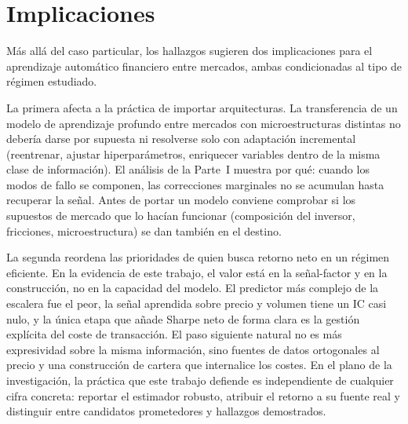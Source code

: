 \section{Implicaciones}

Más allá del caso particular, los hallazgos sugieren dos implicaciones para el aprendizaje
automático financiero entre mercados, ambas condicionadas al tipo de régimen estudiado.

La primera afecta a la práctica de importar arquitecturas. La transferencia de un modelo
de aprendizaje profundo entre mercados con microestructuras distintas no debería darse por
supuesta ni resolverse solo con adaptación incremental (reentrenar, ajustar
hiperparámetros, enriquecer variables dentro de la misma clase de información). El
análisis de la Parte~I muestra por qué: cuando los modos de fallo se componen, las
correcciones marginales no se acumulan hasta recuperar la señal. Antes de portar un modelo
conviene comprobar si los supuestos de mercado que lo hacían funcionar (composición del
inversor, fricciones, microestructura) se dan también en el destino.

La segunda reordena las prioridades de quien busca retorno neto en un régimen eficiente.
En la evidencia de este trabajo, el valor está en la señal-factor y en la construcción,
no en la capacidad del modelo. El predictor más complejo de la escalera fue el peor, la
señal aprendida sobre precio y volumen tiene un IC casi nulo, y la única etapa que añade
Sharpe neto de forma clara es la gestión explícita del coste de transacción. El paso
siguiente natural no es más expresividad sobre la misma información, sino fuentes de datos
ortogonales al precio y una construcción de cartera que internalice los costes. En el
plano de la investigación, la práctica que este trabajo defiende es independiente de
cualquier cifra concreta: reportar el estimador robusto, atribuir el retorno a su fuente
real y distinguir entre candidatos prometedores y hallazgos demostrados.
